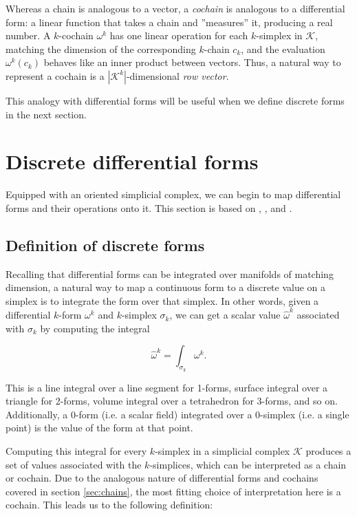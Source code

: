 \documentclass[utf8,english]{gradu3}
\begin{document}
Whereas a chain is analogous to a vector,
a \textit{cochain} is analogous to a differential form:
a linear function that takes a chain and ''measures'' it,
producing a real number.
A $k$-cochain $\omega^k$ has one linear operation for each $k$-simplex in $\mathcal{K}$,
matching the dimension of the corresponding $k$-chain $c_k$,
and the evaluation $\omega^k(c_k)$ behaves like an inner product between vectors.
Thus, a natural way to represent a cochain is a $|\mathcal{K}^k|$-dimensional \textit{row vector}.

This analogy with differential forms will be useful
when we define discrete forms in the next section.


\section{Discrete differential forms}

Equipped with an oriented simplicial complex,
we can begin to map differential forms and their operations onto it.
This section is based on \parencite{desbrun_discrete_2006},
\parencite{crane_digital_2013}, and \parencite{blair_perot_differential_2014}.


\subsection{Definition of discrete forms}\label{sec:discrete_forms}

Recalling that differential forms can be integrated
over manifolds of matching dimension,
a natural way to map a continuous form to a discrete value on a simplex
is to integrate the form over that simplex.
In other words, given a differential $k$-form $\omega^k$
and $k$-simplex $\sigma_k$, we can get a scalar value $\widehat{\omega}^k$
associated with $\sigma_k$ by computing the integral

\[
  \widehat{\omega}^k = \int_{\sigma_k} \omega^k.
\]

This is a line integral over a line segment for 1-forms,
surface integral over a triangle for 2-forms,
volume integral over a tetrahedron for 3-forms, and so on.
Additionally, a 0-form (i.e. a scalar field)
integrated over a 0-simplex (i.e. a single point)
is the value of the form at that point.

Computing this integral for every $k$-simplex in a simplicial complex $\mathcal{K}$
produces a set of values associated with the $k$-simplices,
which can be interpreted as a chain or cochain.
Due to the analogous nature of differential forms and cochains
covered in section \ref{sec:chains},
the most fitting choice of interpretation here is a cochain.
This leads us to the following definition:
\end{document}
